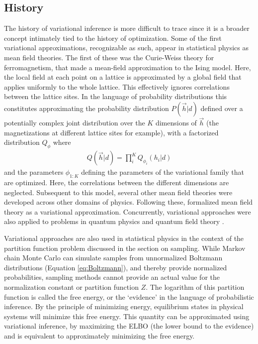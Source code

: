 \subsection{History}

The history of variational inference is more difficult to trace since it is a broader concept intimately tied to the history of optimization. Some of the first variational approximations, recognizable as such, appear in statistical physics as mean field theories. The first of these was the Curie-Weiss theory for ferromagnetism, that made a mean-field approximation to the Ising model\cite{curie1895proprietes,  weiss1907hypothese}. Here, the local field at each point on a lattice is approximated by a global field that applies uniformly to the whole lattice. This effectively ignores correlations between the lattice sites. In the language of probability distributions this constitutes approximating the probability distribution $P(\vec{h} | d)$ defined over a potentially complex joint distribution over the $K$ dimensions of $\vec{h}$ (the magnetizations at different lattice sites for example), with a factorized distribution $Q_\phi$ where
\begin{align}
Q(\vec{h}| d) = \prod_{i}^K Q_{\phi_i}(h_i | d)
\end{align}
and the parameters $\phi_{1:K}$ defining the parameters of the variational family that are optimized. Here, the correlations between the different dimensions are neglected. Subsequent to this model, several other mean field theories were developed across other domains of physics. Following these, \citet{landau1965collected} formalized mean field theory as a variational approximation\cite{kadanoff2009more}. Concurrently, variational approaches were also applied to problems in quantum physics and quantum field theory \citep{milton2006electromagnetic, feynman1965quantum}.

Variational approaches are also used in statistical physics in the context of the partition function problem discussed in the section on sampling\citep{kikuchi1951theory, bethe1935statistical}. While Markov chain Monte Carlo can simulate samples from unnormalized Boltzmann distributions (Equation \ref{eq:Boltzmann}), and thereby provide normalized probabilities, sampling methods cannot provide an actual value for the normalization constant or partition function $Z$. The logarithm of this partition function is called the free energy, or the `evidence' in the language of probabilistic inference. By the principle of minimizing energy, equilibrium states in physical systems will minimize this free energy. This quantity can be approximated using variational inference, by maximizing the ELBO (the lower bound to the evidence) and is equivalent to approximately minimizing the free energy. 

